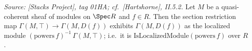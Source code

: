 \begin{lemma}
  \label{lem:qcoh_affine_section_localization}
  \textit{Source: [Stacks Project], tag 01HA; cf.\ [Hartshorne], II.5.2.}
  Let \(M\) be a quasi-coherent sheaf of modules on \(\Spec R\) and \(f \in R\). Then the section
  restriction map \(\Gamma(M, \top) \to \Gamma(M, D(f))\) exhibits \(\Gamma(M, D(f))\) as the
  localized module \((\mathrm{powers}\,f)^{-1}\,\Gamma(M, \top)\); i.e.\ it is
  \(\mathrm{IsLocalizedModule}(\mathrm{powers}\,f)\) over \(R\).
\end{lemma}
